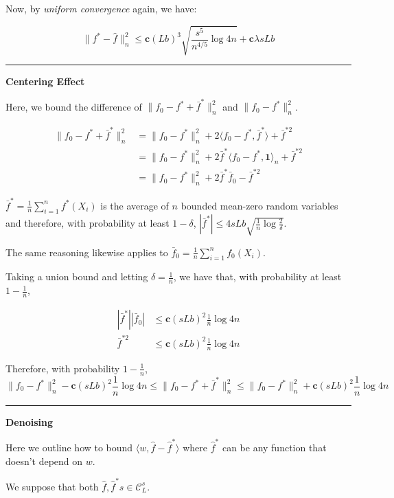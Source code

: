 \documentclass{article}
\begin{document}
{Now, by \emph{uniform convergence} again, we have:

\[
\| f^* - \hat{f} \|_n^2 \leq \mathbf{c} (Lb)^3 \sqrt{\frac{s^5}{n^{4/5}} \log 4n} + 
      \mathbf{c} \lambda s L b
\]

\rule{5cm}{0.4pt}
\vspace{0.2in}

\textbf{Centering Effect}

Here, we bound the difference of $\| f_0 - f^* + \bar{f}^* \|_n^2$ and $\| f_0 - f^* \|_n^2$.

\begin{align*}
\| f_0 - f^* + \bar{f}^* \|_n^2 &= \| f_0 - f^* \|_n^2 
    + 2 \langle f_0 - f^*, \bar{f}^* \rangle + \bar{f}^{*2} \\
  &= \| f_0 - f^* \|_n^2 + 2 \bar{f}^* \langle f_0 - f^*, \mathbf{1} \rangle_n + 
    \bar{f}^{*2} \\
  &= \| f_0 - f^* \|_n^2 + 2 \bar{f}^* \bar{f}_0 - \bar{f}^{*2}
\end{align*}


$\bar{f}^* = \frac{1}{n} \sum_{i=1}^n f^*(X_i)$ is the average of $n$ bounded mean-zero random variables and therefore, with probability at least $1-\delta$, $| \bar{f}^* | \leq 4 s L b \sqrt{ \frac{1}{n} \log \frac{2}{\delta} }$.

The same reasoning likewise applies to $\bar{f}_0 = \frac{1}{n} \sum_{i=1}^n f_0(X_i)$.

Taking a union bound and letting $\delta = \frac{1}{n}$, we have that, with probability at least $1- \frac{1}{n}$, 

\begin{align*}
| \bar{f}^* | | \bar{f}_0 | &\leq \mathbf{c} (sLb)^2 \frac{1}{n} \log 4 n \\
\bar{f}^{*2} &\leq \mathbf{c} (sLb)^2 \frac{1}{n} \log 4 n
\end{align*}

Therefore, with probability $1-\frac{1}{n}$,
\[
\|f_0 - f^*\|_n^2 - \mathbf{c} (sLb)^2 \frac{1}{n} \log 4 n \leq
    \| f_0 - f^* + \bar{f}^* \|_n^2 \leq 
\|f_0 - f^*\|_n^2 + \mathbf{c} (sLb)^2 \frac{1}{n} \log 4 n
\]

\rule{5cm}{0.4pt}
\vspace{0.2in}

\textbf{Denoising}

Here we outline how to bound $\langle w, \hat{f} - \hat{f}^* \rangle$ where $\hat{f}^*$ can be any function that doesn't depend on $w$.

We suppose that both $\hat{f}, \hat{f}^*s \in \mathcal{C}^s_L$.

}
\end{document}
